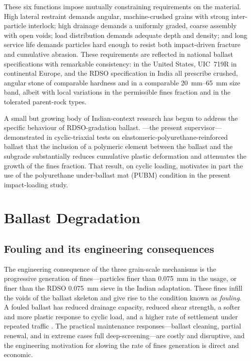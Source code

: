 These six functions impose mutually constraining requirements on the
material. High lateral restraint demands angular, machine-crushed grains
with strong inter-particle interlock; high drainage demands a uniformly
graded, coarse assembly with open voids; load distribution demands
adequate depth and density; and long service life demands particles hard
enough to resist both impact-driven fracture and cumulative abrasion.
These requirements are reflected in national ballast specifications with
remarkable consistency: \citet{AREMA2020} in the United States, UIC~719R
in continental Europe, and the RDSO specification \citep{RDSO2023} in
India all prescribe crushed, angular stone of comparable hardness and in
a comparable \SIrange{20}{65}{\milli\metre} size band, albeit with local
variations in the permissible fines fraction and in the tolerated
parent-rock types.

A small but growing body of Indian-context research has begun to address
the specific behaviour of \gls{RDSO}-gradation ballast.
\citet{Gundavaram2023}---the present supervisor---demonstrated in
cyclic-triaxial tests on elastomeric-polyurethane-reinforced ballast that
the inclusion of a polymeric element between the ballast and the
subgrade substantially reduces cumulative plastic deformation and
attenuates the growth of the fines fraction. That result, on cyclic
loading, motivates in part the use of the polyurethane under-ballast mat
(\gls{PUBM}) condition in the present impact-loading study.

\section{Ballast Degradation}
\label{sec:lit-degradation}

\subsection{Fouling and its engineering consequences}
\label{sec:lit-fouling}

The engineering consequence of the three grain-scale mechanisms is the
progressive generation of fines---particles finer than
\SI{0.075}{\milli\metre} in the \citet{Selig1994} usage, or finer than the
\gls{RDSO} \SI{0.075}{\milli\metre} sieve in the Indian adaptation. These
fines infill the voids of the ballast skeleton and give rise to the
condition known as \textit{fouling}. A fouled ballast has reduced drainage
capacity, reduced shear strength, a softer and more plastic response to
cyclic load, and a higher rate of settlement under repeated traffic
\citep{Huang2009, Tutumluer2013}. The practical maintenance
responses---ballast cleaning, partial renewal, and in extreme cases full
deep-screening---are costly and disruptive, and the engineering motivation
for slowing the rate of fines generation is direct and economic.

